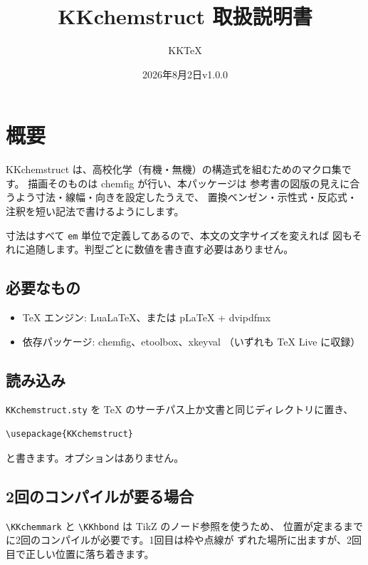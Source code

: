 \documentclass[paper=a4paper,fontsize=10pt]{jlreq}
\title{KKchemstruct 取扱説明書}
\author{KKTeX}
\date{2026年8月2日\quad v1.0.0}
\begin{document}
\maketitle
\tableofcontents

\section{概要}

\textsf{KKchemstruct} は、高校化学（有機・無機）の構造式を組むためのマクロ集です。
描画そのものは \textsf{chemfig} が行い、本パッケージは
参考書の図版の見えに合うよう寸法・線幅・向きを設定したうえで、
置換ベンゼン・示性式・反応式・注釈を短い記法で書けるようにします。

寸法はすべて \verb|em| 単位で定義してあるので、本文の文字サイズを変えれば
図もそれに追随します。判型ごとに数値を書き直す必要はありません。

\subsection{必要なもの}

\begin{itemize}
\item TeX エンジン: LuaLaTeX、または pLaTeX + dvipdfmx
\item 依存パッケージ: \textsf{chemfig}、\textsf{etoolbox}、\textsf{xkeyval}
      （いずれも TeX Live に収録）
\end{itemize}

\subsection{読み込み}

\verb|KKchemstruct.sty| を TeX のサーチパス上か文書と同じディレクトリに置き、

\begin{verbatim}
\usepackage{KKchemstruct}
\end{verbatim}

と書きます。オプションはありません。

\subsection{2回のコンパイルが要る場合}

\verb|\KKchemmark| と \verb|\KKhbond| は TikZ のノード参照を使うため、
位置が定まるまでに2回のコンパイルが必要です。1回目は枠や点線が
ずれた場所に出ますが、2回目で正しい位置に落ち着きます。
\end{document}
